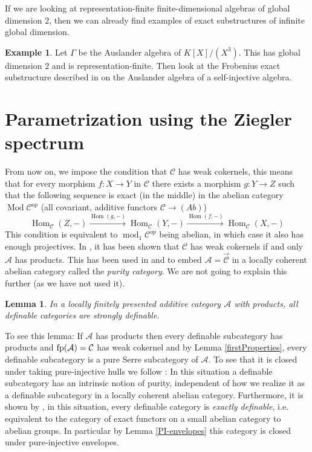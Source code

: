 \documentclass[11pt,a4paper]{amsart}
\theoremstyle{plain}
\newtheorem{lem}[thm]{Lemma}
\theoremstyle{definition}
\newtheorem{exa}[thm]{Example}
\DeclareMathOperator{\Hom}{Hom}
\DeclareMathOperator{\modu}{mod}
\DeclareMathOperator{\Modu}{Mod}
\newcommand{\mcA}{\mathcal{A}}
\newcommand{\mcC}{\mathcal{C}}
\begin{document}
If we are looking at representation-finite finite-dimensional algebras of global dimension $2$, then we can already find examples of exact substructures of infinite global dimension. 
\begin{exa}
Let $\Gamma$ be the Auslander algebra of $K[X]/(X^3)$. This has global dimension $2$ and is representation-finite. Then look at the Frobenius exact substructure described in \cite{ASo-Gor} on the Auslander algebra of a self-injective algebra.         
\end{exa}



\section{Parametrization using the Ziegler spectrum}

From now on, we impose the condition that $\mcC$ has weak cokernels, this means that for every morphism $f\colon X\to Y$ in $\mcC$ there exists a morphism $g \colon Y \to Z$ such that the following sequence is exact (in the middle) in the abelian category $\Modu \mcC^{op}$ (all covariant, additive functors $\mcC\to (Ab)$) 
\[
\Hom_{\mcC} (Z,-) \xrightarrow{\Hom (g,-)}\Hom_{\mcC} (Y,-) \xrightarrow{\Hom (f,-)} \Hom_{\mcC} (X,-) 
\]
This condition is equivalent to $\modu_1\mcC^{op}$ being abelian, in which case it also has enough projectives. In \cite{CB}, it has been shown that $\mcC$ has weak cokernels if and only $\mcA$ has products. This has been used in  \cite{CB} and \cite{Sch} to embed $\mcA=\overrightarrow{\mcC}$ in a locally coherent abelian category called the \emph{purity category}. We are not going to explain this further (as we have not used it).

\begin{lem} In a locally finitely presented additive category $\mcA$ with products, all definable categories are strongly definable. 
\end{lem}

To see this lemma: If $\mcA$ has products then every definable subcategory has products and 
${\rm fp}(\mcA)=\mcC$ has weak cokernel and by Lemma \ref{firstProperties}, every definable subcategory is a pure Serre subcategory of $\mcA$. 
To see that it is closed under taking pure-injective hulls we follow \cite[chapter 18, introduction]{Pr}: In this situation a definable subcategory has an intrinsic notion of purity, independent of how we realize it as a definable subcategory in a locally coherent abelian category. Furthermore, it is shown by \cite{Kr-Exactly}, in this situation, every definable category is \emph{exactly definable}, i.e.  equivalent to the category of exact functors on a small abelian category to abelian groups. In particular by Lemma \ref{PI-envelopes} this category is closed under pure-injective envelopes. 
\end{document}
